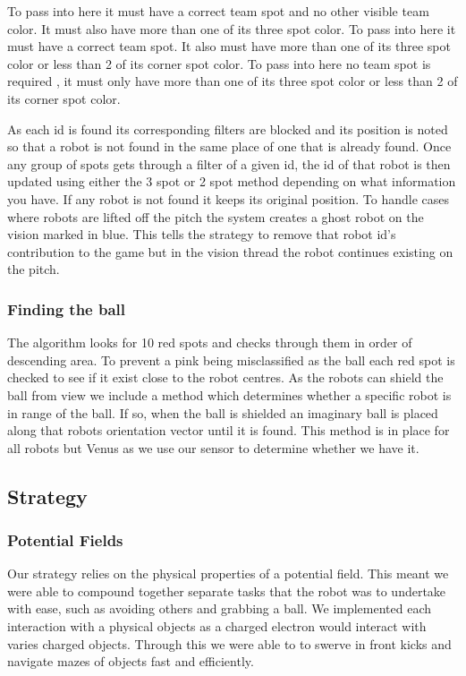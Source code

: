 \documentclass[a4paper,12pt]{article}
\newcommand{\mybox}[2]{{\color{#1}\fbox{\normalcolor#2}}}
\begin{document}
\begin{minipage}{0.3\textwidth}\raggedleft 
\mybox{black}{FILTER 1} To pass into here it must have a correct team spot and no other visible team color. It must also have more than one of its three spot color.\newline\newline
\mybox{yellow}{FILTER 2} To pass into here it must have a correct team spot. It also must have more than one of its three spot color or less than 2 of its corner spot color.\newline\newline
\mybox{violet}{FILTER 3} To pass into here no team spot is required , it must only have more than one of its three spot color or less than 2 of its corner spot color.
\end{minipage}\newline\newline 
As each id is found its corresponding filters are blocked  and its position is noted so that a robot is not found in the same place of one that is already found. Once any group of spots gets through a filter of a given id, the id of that robot is then updated using either the 3 spot or 2 spot method depending on what information you have. If any robot is not found it keeps its original position. To handle cases where robots are lifted off the pitch the system creates a ghost robot on the vision marked in blue. This tells the strategy to remove that robot id's contribution to the game but in the vision thread the robot continues existing on the pitch.
\subsubsection{Finding the ball}
The algorithm looks for 10 red spots and checks through them in order of descending area. To prevent a pink being misclassified as the ball each red spot is checked to see if it exist close to the robot centres. As the robots can shield the ball from view we include a method which determines whether a specific robot is in range of the ball. If so, when the ball is shielded an imaginary ball is placed along that robots orientation vector until it is found. This method is in place for all robots but Venus as we use our sensor to determine whether we have it.
\subsection{Strategy}
\subsubsection{Potential Fields}
Our strategy relies on the physical properties of a potential field. This meant we were able to compound together separate tasks that the robot was to undertake with ease, such as avoiding others and grabbing a ball. We implemented each interaction with a physical objects as a charged electron would interact with varies charged objects. Through this we were able to to swerve in front kicks and navigate mazes of objects fast and efficiently. 
\end{document}

